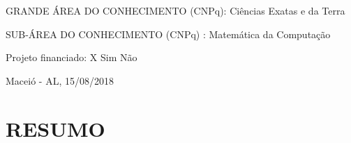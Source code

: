 \documentclass[12pt,letterpaper]{article}
\begin{document}
GRANDE ÁREA DO CONHECIMENTO (CNPq): Ciências  Exatas  e  da  Terra

SUB-ÁREA DO CONHECIMENTO (CNPq) : Matemática  da  Computação   

\vspace{0.5cm}

Projeto financiado:  \hspace*{1.5cm} X Sim \hspace*{1.5cm}  Não

\vspace*{0.8cm}

\begin{center}

Maceió - AL, 15/08/2018

\end{center}


\newpage
\section*{\centering \textbf{RESUMO}} %
\end{document}
